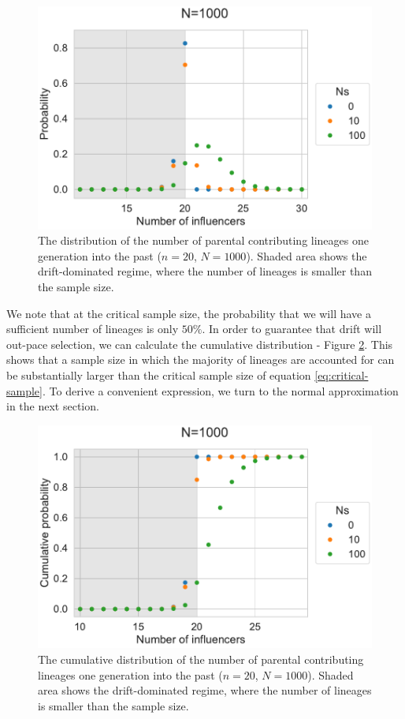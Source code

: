 \documentclass[review]{elsarticle}
\begin{document}
\begin{figure}
  \centering
  \includegraphics[]{fig/sampling-dist.pdf}
  \caption{The distribution of the number of parental contributing lineages one generation into the
    past ($n=20$, $N=1000$). Shaded area shows the drift-dominated regime, where the number of
    lineages is smaller than the sample size.}
  \label{fig:sampling-dist}
\end{figure}

We note that at the critical sample size, the probability that we will have a sufficient number of
lineages is only $50\%$. In order to guarantee that drift will out-pace selection, we can calculate
the cumulative distribution - Figure \ref{fig:cumulative-dist}. This shows that a sample size in
which the majority of lineages are accounted for can be substantially larger than the critical
sample size of equation \eqref{eq:critical-sample}. To derive a convenient expression, we turn to
the normal approximation in the next section.

\begin{figure}
  \centering
  \includegraphics[]{fig/cumulative-dist.pdf}
   \caption{The cumulative distribution of the number of parental contributing lineages one generation into the
    past ($n=20$, $N=1000$). Shaded area shows the drift-dominated regime, where the number of
    lineages is smaller than the sample size.}
  \label{fig:cumulative-dist}
\end{figure}
\end{document}
